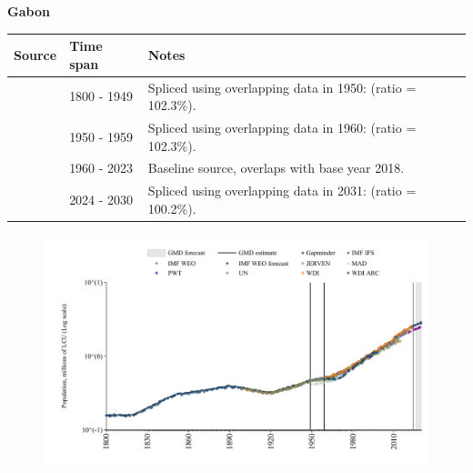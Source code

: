 \documentclass[12pt,a4paper,landscape]{article}
\begin{document}
\begin{adjustbox}{max totalsize={\paperwidth}{\paperheight},center}
\begin{minipage}[t][\textheight][t]{\textwidth}
\vspace*{0.5cm}
{}
\begin{center}
{\Large\bfseries Gabon}
\end{center}
\vspace{0.5cm}
\begin{table}[H]
\centering
\small
\begin{tabular}{|l|l|l|}
\hline
\textbf{Source} & \textbf{Time span} & \textbf{Notes} \\
\hline
\rowcolor{white}\cite{Gapminder}& 1800 - 1949 &Spliced using overlapping data in 1950: (ratio = 102.3\%).\\
\rowcolor{lightgray}\cite{IMF_IFS}& 1950 - 1959 &Spliced using overlapping data in 1960: (ratio = 102.3\%).\\
\rowcolor{white}\cite{WDI}& 1960 - 2023 &Baseline source, overlaps with base year 2018.\\
\rowcolor{lightgray}\cite{Gapminder}& 2024 - 2030 &Spliced using overlapping data in 2031: (ratio = 100.2\%).\\
\hline
\end{tabular}
\end{table}
\begin{figure}[H]
\centering
\includegraphics[width=\textwidth,height=0.6\textheight,keepaspectratio]{graphs/GAB_pop.pdf}
\end{figure}
\end{minipage}
\end{adjustbox}
\end{document}
